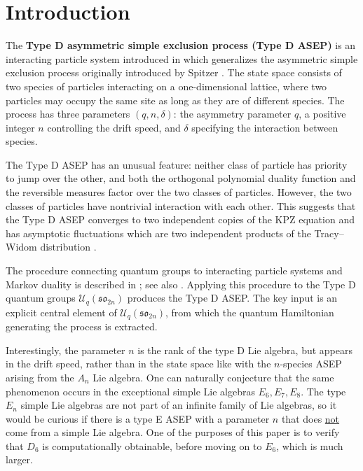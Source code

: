 \documentclass{ximera}
\newcommand{\so}{\mathfrak{so}}
\newcommand{\Uq}{\mathcal{U}_q}
\begin{document}
\section{Introduction}

The \textbf{Type D asymmetric simple exclusion process (Type D ASEP)} is an interacting particle system introduced in \cite{kuan2020} which generalizes the asymmetric simple exclusion process originally introduced by Spitzer \cite{Spit70}. The state space consists of two species of particles interacting on a one-dimensional lattice, where two particles may occupy the same site as long as they are of different species. The process has three parameters $(q, n, \delta)$: the asymmetry parameter $q$, a positive integer $n$ controlling the drift speed, and $\delta$ specifying the interaction between species.

The Type D ASEP has an unusual feature: neither class of particle has priority to jump over the other, and both the orthogonal polynomial duality function and the reversible measures factor over the two classes of particles. However, the two classes of particles have nontrivial interaction with each other. This suggests that the Type D ASEP converges to two independent copies of the KPZ equation \cite{KPZ86, BG97, Cor12, Cor16, CS18, GJ17, ACH24, CGMO25, GOVW22} and has asymptotic fluctuations which are two independent products of the Tracy--Widom distribution \cite{TW94, TW96, Joh00}.

The procedure connecting quantum groups to interacting particle systems and Markov duality is described in \cite{CGRS}; see also \cite{Sch97, IS11, CGRS16a}. Applying this procedure to the Type D quantum groups $\Uq(\so_{2n})$ produces the Type D ASEP. The key input is an explicit central element of $\Uq(\so_{2n})$, from which the quantum Hamiltonian generating the process is extracted.

Interestingly, the parameter $n$ is the rank of the type D Lie algebra, but appears in the drift speed, rather than in the state space like with the \(n\)-species ASEP arising from the $A_n$ Lie algebra. One can naturally conjecture that the same phenomenon occurs in the exceptional simple Lie algebras $E_6,E_7,E_8$. The type $E_n$ simple Lie algebras are not part of an infinite family of Lie algebras, so it would be curious if there is a type E ASEP with a parameter $n$ that does \underline{not} come from a simple Lie algebra. One of the purposes of this paper is to verify that $D_6$ is computationally obtainable, before moving on to $E_6$, which is much larger. 
\end{document}
